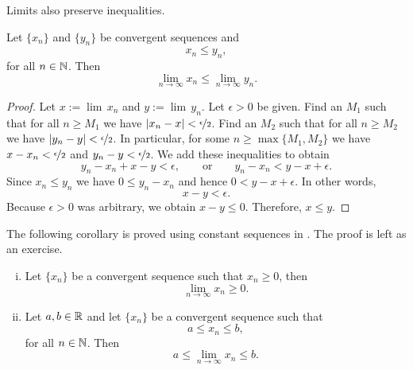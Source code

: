 Limits also preserve inequalities.

\begin{lemma} \label{limandineq:lemma}
Let $\{ x_n \}$ and $\{ y_n \}$ be
convergent sequences and
\begin{equation*}
x_n \leq y_n ,
\end{equation*}
for all $n \in {\mathbb{N}}$.  Then
\begin{equation*}
\lim_{n\to\infty} x_n \leq
\lim_{n\to\infty} y_n .
\end{equation*}
\end{lemma}

\begin{proof}
Let $x := \lim\, x_n$ and $y := \lim\, y_n$. 
Let 
$\epsilon > 0$ be given.  Find an $M_1$ such that for all $n \geq M_1$
we have $\left\lvert {x_n-x} \right\rvert < \nicefrac{\epsilon}{2}$.  Find an $M_2$ such that
for all $n \geq M_2$ we have
$\left\lvert {y_n-y} \right\rvert < \nicefrac{\epsilon}{2}$.  In particular,
for some $n \geq \max\{ M_1, M_2 \}$ we have
$x-x_n < \nicefrac{\epsilon}{2}$ and
$y_n-y < \nicefrac{\epsilon}{2}$.  We add these inequalities to
obtain
\begin{equation*}
y_n-x_n+x-y < \epsilon, \qquad \text{or} \qquad
y_n-x_n < y-x+ \epsilon .
\end{equation*}
Since $x_n \leq y_n$ we have
$0 \leq y_n-x_n$ and hence $0 < y-x+ \epsilon$.
In other words,
\begin{equation*}
x-y < \epsilon .
\end{equation*}
Because $\epsilon > 0$ was arbitrary, we obtain
$x-y \leq 0$.
Therefore, $x \leq y$.
\end{proof}

The following corollary is
proved
using constant sequences in
.  The proof is left as an exercise.

\begin{samepage}
\begin{cor} \label{limandineq:cor}
\leavevmode
\begin{enumerate}[(i)]
\item Let $\{ x_n \}$ be a convergent sequence such that $x_n \geq 0$,
then
\begin{equation*}
\lim_{n\to\infty} x_n \geq 0.
\end{equation*}
\item
Let $a,b \in {\mathbb{R}}$ and
let $\{ x_n \}$ be a convergent sequence such that
\begin{equation*}
a \leq x_n \leq b ,
\end{equation*}
for all $n \in {\mathbb{N}}$.  Then
\begin{equation*}
a \leq \lim_{n\to\infty} x_n \leq b.
\end{equation*}
\end{enumerate}
\end{cor}
\end{samepage}

